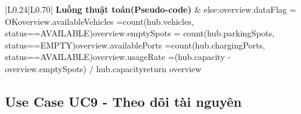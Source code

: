 \begin{longtable}{|L{0.24\textwidth}|L{0.70\textwidth}|}
\hline
\textbf{Luồng thuật toán}\newline \textbf{(Pseudo-code)} & else:\newline overview.dataFlag = OK\newline overview.availableVehicles =\newline count(hub.vehicles, status==AVAILABLE)\newline overview.emptySpots = count(hub.parkingSpots, status==EMPTY)\newline overview.availablePorts =\newline count(hub.chargingPorts, status==AVAILABLE)\newline overview.usageRate =\newline (hub.capacity - overview.emptySpots) / hub.capacity\newline return overview \\
\hline
\end{longtable}
\vspace{-0.5\baselineskip}
\subsection{Use Case UC9 - Theo dõi tài nguyên}
